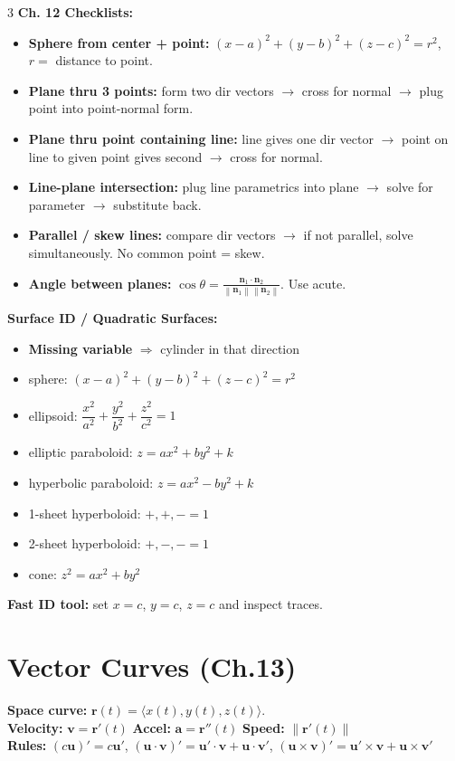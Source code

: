 \documentclass[12pt, landscape]{article}
\newcommand{\vct}[1]{\bm{#1}}
\newcommand{\norm}[1]{\left\lVert#1\right\rVert}
\newcommand{\dotp}{\!\cdot\!}
\begin{document}
\begin{multicols}{3}
		\textbf{Ch. 12 Checklists:}
		\begin{itemize}
			\item \textbf{Sphere from center + point:} $(x-a)^2+(y-b)^2+(z-c)^2=r^2$, $r=$ distance to point.
			\item \textbf{Plane thru 3 points:} form two dir vectors $\to$ cross for normal $\to$ plug point into point-normal form.
			\item \textbf{Plane thru point containing line:} line gives one dir vector $\to$ point on line to given point gives second $\to$ cross for normal.
			\item \textbf{Line-plane intersection:} plug line parametrics into plane $\to$ solve for parameter $\to$ substitute back.
			\item \textbf{Parallel / skew lines:} compare dir vectors $\to$ if not parallel, solve simultaneously. No common point = skew.
			\item \textbf{Angle between planes:} $\cos\theta=\frac{\vct n_1\dotp \vct n_2}{\norm{\vct n_1}\norm{\vct n_2}}$. Use acute.
		\end{itemize}
		
		\textbf{Surface ID / Quadratic Surfaces:}
		\begin{itemize}
			\item \textbf{Missing variable} $\Rightarrow$ cylinder in that direction
			\item sphere: $(x-a)^2+(y-b)^2+(z-c)^2=r^2$
			\item ellipsoid: $\dfrac{x^2}{a^2}+\dfrac{y^2}{b^2}+\dfrac{z^2}{c^2}=1$
			\item elliptic paraboloid: $z=ax^2+by^2+k$
			\item hyperbolic paraboloid: $z=ax^2-by^2+k$
			\item 1-sheet hyperboloid: $+,+,-=1$
			\item 2-sheet hyperboloid: $+,-,-=1$
			\item cone: $z^2=ax^2+by^2$
		\end{itemize}
		\textbf{Fast ID tool:} set $x=c$, $y=c$, $z=c$ and inspect traces.
		
		\section{Vector Curves (Ch.13)}
		\textbf{Space curve:} $\vct r(t)=\langle x(t),y(t),z(t)\rangle$.\\
		\textbf{Velocity:} $\vct v=\vct r'(t)$ \quad \textbf{Accel:} $\vct a=\vct r''(t)$ \quad \textbf{Speed:} $\norm{\vct r'(t)}$\\
		\textbf{Rules:} $(c\vct u)'=c\vct u'$, $(\vct u\dotp\vct v)'=\vct u'\dotp\vct v+\vct u\dotp\vct v'$, $(\vct u\times\vct v)'=\vct u'\times\vct v+\vct u\times\vct v'$
		

\end{multicols}
\end{document}
